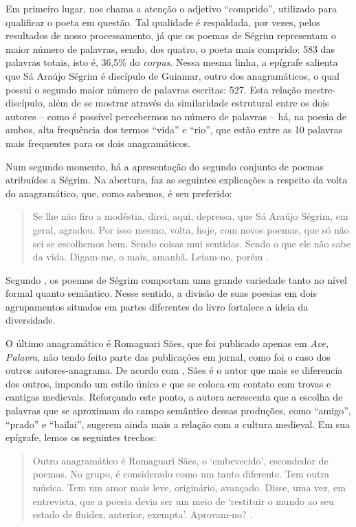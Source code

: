 \documentclass[portuguese]{textolivre}
\begin{document}
Em primeiro lugar, nos chama a atenção o adjetivo “comprido”, utilizado para qualificar o poeta em questão. Tal qualidade é respaldada, por vezes, pelos resultados de nosso processamento, já que os poemas de Ségrim representam o maior número de palavras, sendo, dos quatro, o poeta mais comprido: 583 das palavras totais, isto é, 36,5\% do \textit{corpus}. Nessa mesma linha, a epígrafe salienta que Sá Araújo Ségrim é discípulo de Guiamar, outro dos anagramáticos, o qual possui o segundo maior número de palavras escritas: 527. Esta relação mestre-discípulo, além de se mostrar através da similaridade estrutural entre os dois autores – como é possível percebermos no número de palavras – há, na poesia de ambos, alta frequência dos termos “vida” e “rio”, que estão entre as 10 palavras mais frequentes para os dois anagramáticos. 

Num segundo momento, há a apresentação do segundo conjunto de poemas atribuídos a Ségrim. Na abertura, \textcite{rosa_ave_1985} faz as seguintes explicações a respeito da volta do anagramático, que, como sabemos, é seu preferido:

\begin{quote}
    Se lhe não firo a modéstia, direi, aqui, depressa, que Sá Araújo Ségrim, em geral, agradou. Por isso mesmo, volta, hoje, com novos poemas, que só não sei se escolhemos bem. Sendo coisas mui sentidas. Sendo o que ele não sabe da vida. Digam-me, o mais, amanhã. Leiam-no, porém \cite[p. 184]{rosa_ave_1985}.
\end{quote}

Segundo \textcite{rossi_as_2007}, os poemas de Ségrim comportam uma grande variedade tanto no nível formal quanto semântico. Nesse sentido, a divisão de suas poesias em dois agrupamentos situados em partes diferentes do livro fortalece a ideia da diversidade.

O último anagramático é Romaguari Sães, que foi publicado apenas em \textit{Ave, Palavra}, não tendo feito parte das publicações em jornal, como foi o caso dos outros autores-anagrama. De acordo com \textcite{rossi_as_2007}, Sães é o autor que mais se diferencia dos outros, impondo um estilo único e que se coloca em contato com trovas e cantigas medievais. Reforçando este ponto, a autora acrescenta que a escolha de palavras que se aproximam do campo semântico dessas produções, como “amigo”, “prado” e “bailai”, sugerem ainda mais a relação com a cultura medieval. Em sua epígrafe, lemos os seguintes trechos:

\begin{quote}
    Outro anagramático é Romaguari Sães, o ‘embevecido’, escondedor de poemas. No grupo, é considerado como um tanto diferente. Tem outra música. Tem um amor mais leve, originário, avançado. Disse, uma vez, em entrevista, que a poesia devia ser um meio de ‘restituir o mundo ao seu estado de fluidez, anterior, exempta’. Aprovam-no? \cite[p. 184]{rosa_ave_1985}.
\end{quote}
\end{document}
